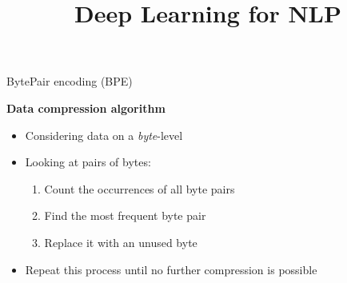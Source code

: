 



\newcommand\warning{%
 \makebox[1.4em][c]{%
 \makebox[0pt][c]{\raisebox{.1em}{\scriptsize!}}%
 \makebox[0pt][c]{\color{red}\normalsize$\bigtriangleup$}}}%

\newcommand{\titlefigure}{figure/transformer.png}
\newcommand{\learninggoals}{
\item Understand BPE
\item Understand the Transformer Encoder + Decoder
\item Understand how they are connected
\item Understand the limitations for long sequences}

\title{Deep Learning for NLP}
\date{}




\begin{vbframe}{BytePair encoding (BPE)}

\vfill

\textbf{Data compression algorithm \href{https://www.derczynski.com/papers/archive/BPE_Gage.pdf}{}}

	\begin{itemize}
		\item Considering data on a \textit{byte}-level
		\item Looking at pairs of bytes:
			\begin{enumerate}
				\item Count the occurrences of all byte pairs
				\item Find the most frequent byte pair
				\item Replace it with an unused byte
			\end{enumerate}
		\item Repeat this process until no further compression is possible
	\end{itemize}

\vfill

\end{vbframe}


